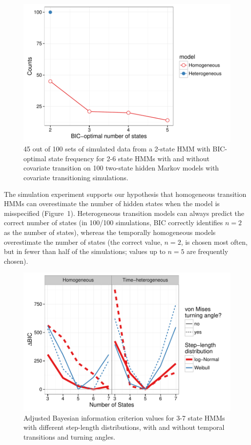 \documentclass{bmcart}
\begin{document}
  \begin{figure}[h!]
   \includegraphics[width=5in]{figure/sim_results-1}
  \caption{ 45 out of 100 sets of simulated data from a 2-state HMM with BIC-optimal state frequency for 2-6 state HMMs with and without covariate transition on 100 two-state hidden Markov models with covariate transitioning simulations.}
      \end{figure}
      
The simulation experiment supports our hypothesis that homogeneous transition HMMs can overestimate the number of hidden states when the model is misspecified (Figure~1). Heterogeneous transition models can always predict the correct number of states (in 100/100 simulations, BIC correctly identifies $n=2$ as the number of states), whereas the temporally homogeneous models overestimate the number of states (the correct value, $n=2$, is chosen most often, but in fewer than half of the simulations; values up to $n=5$ are frequently chosen).

  \begin{figure}[h!]
   \includegraphics[width=5in]{figure/BICred_plot-1}
  \caption{ Adjusted Bayesian information criterion values for 3-7 state HMMs with different step-length distributions, with and without temporal transitions and turning angles.}
      \end{figure}
\end{document}

